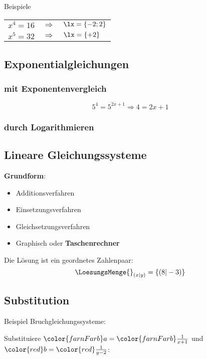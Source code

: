 \begin{multicols}{2}
Beispiele

\begin{tabular}{rcl}
$x^4=16$ & $\Longrightarrow$ & $\lx=\{-2; 2\}  $ \\
$x^5=32$ & $\Longrightarrow$ & $\lx=\{+2\}  $ \\

\end{tabular}

\subsection*{Exponentialgleichungen}
\subsubsection*{mit Exponentenvergleich}

$$5^4 = 5^{2x+1} \Longrightarrow  4=2x+1$$

\subsubsection*{durch Logarithmieren}


\subsection*{Lineare Gleichungssysteme}
\textbf{Grundform}:

\begin{itemize}
\item Additionsverfahren
\item Einsetzungsverfahren
\item Gleichsetzungsverfahren
\item Graphisch oder \textbf{Taschenrechner}
\end{itemize}
Die Lösung ist ein geordnetes Zahlenpaar:
$$\LoesungsMenge{}_{(x | y)} = \{(8 | -3)\}$$



\headerUndFooterJedeSeite{}

\subsection*{Substitution}
Beispiel Bruchgleichungssysteme:

Substituiere
${\color{farnFarb}a}={\color{farnFarb}\frac1{x+1}}$ und
${\color{red}b} = {\color{red}\frac1{y-2}}$:


\end{multicols}
